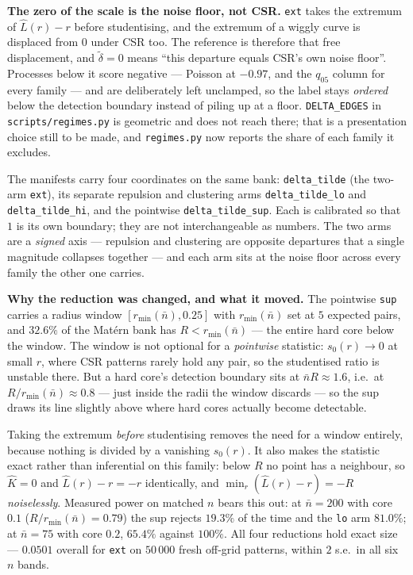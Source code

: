 \documentclass[11pt]{article}
\newcommand{\dt}{\tilde\delta}
\newcommand{\nb}{\bar n}
\newcommand{\rmin}{r_{\min}(\nb)}
\newcommand{\code}[1]{\texttt{#1}}
\begin{document}
\textbf{The zero of the scale is the noise floor, not CSR.} \code{ext} takes the extremum of $\hat L(r)-r$ before studentising, and the extremum of a wiggly curve is displaced from $0$ under CSR too. The reference is therefore that free displacement, and $\dt=0$ means ``this departure equals CSR's own noise floor''. Processes below it score negative --- Poisson at $-0.97$, and the $q_{05}$ column for every family --- and are deliberately left unclamped, so the label stays \emph{ordered} below the detection boundary instead of piling up at a floor. \code{DELTA\_EDGES} in \code{scripts/regimes.py} is geometric and does not reach there; that is a presentation choice still to be made, and \code{regimes.py} now reports the share of each family it excludes.

The manifests carry four coordinates on the same bank: \code{delta\_tilde} (the two-arm \code{ext}), its separate repulsion and clustering arms \code{delta\_tilde\_lo} and \code{delta\_tilde\_hi}, and the pointwise \code{delta\_tilde\_sup}. Each is calibrated so that $1$ is its own boundary; they are not interchangeable as numbers. The two arms are a \emph{signed} axis --- repulsion and clustering are opposite departures that a single magnitude collapses together --- and each arm sits at the noise floor across every family the other one carries.

\textbf{Why the reduction was changed, and what it moved.} The pointwise \code{sup} carries a radius window $[\rmin,0.25]$ with $\rmin$ set at $5$ expected pairs, and $32.6\%$ of the Mat\'ern bank has $R<\rmin$ --- the entire hard core below the window. The window is not optional for a \emph{pointwise} statistic: $s_0(r)\to0$ at small $r$, where CSR patterns rarely hold any pair, so the studentised ratio is unstable there. But a hard core's detection boundary sits at $\nb R\approx1.6$, i.e.\ at $R/\rmin\approx0.8$ --- just inside the radii the window discards --- so the sup draws its line slightly above where hard cores actually become detectable.

Taking the extremum \emph{before} studentising removes the need for a window entirely, because nothing is divided by a vanishing $s_0(r)$. It also makes the statistic exact rather than inferential on this family: below $R$ no point has a neighbour, so $\hat K=0$ and $\hat L(r)-r=-r$ identically, and $\min_r(\hat L(r)-r)=-R$ \emph{noiselessly}. Measured power on matched $n$ bears this out: at $\nb=200$ with core $0.1$ ($R/\rmin=0.79$) the sup rejects $19.3\%$ of the time and the \code{lo} arm $81.0\%$; at $\nb=75$ with core $0.2$, $65.4\%$ against $100\%$. All four reductions hold exact size --- $0.0501$ overall for \code{ext} on $50\,000$ fresh off-grid patterns, within $2$ s.e.\ in all six $n$ bands.
\end{document}
